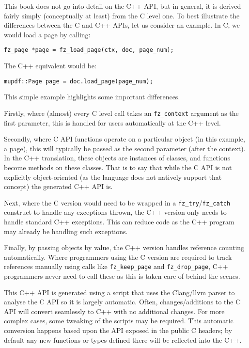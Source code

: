 \documentclass[oneside]{book}
\begin{document}
This book does not go into detail on the C++ API, but in general, it is derived fairly simply (conceptually at least) from the C level one. To best illustrate the differences between the C and C++ APIs, let us consider an example. In C, we would load a page by calling:

\begin{lstlisting}
fz_page *page = fz_load_page(ctx, doc, page_num);
\end{lstlisting}

The C++ equivalent would be:

\begin{lstlisting}
mupdf::Page page = doc.load_page(page_num);
\end{lstlisting}

This simple example highlights some important differences.

Firstly, where (almost) every C level call takes an \texttt{fz\_context} argument as the first parameter, this is handled for users automatically at the C++ level.

Secondly, where C API functions operate on a particular object (in this example, a page), this will typically be passed as the second parameter (after the context). In the C++ translation, these objects are instances of classes, and functions become methods on these classes. That is to say that while the C API is not explicitly object-oriented (as the language does not natively support that concept) the generated C++ API is.

Next, where the C version would need to be wrapped in a \texttt{fz\_try}/\texttt{fz\_catch} construct to handle any exceptions thrown, the C++ version only needs to handle standard C++ exceptions. This can reduce code as the C++ program may already be handling such exceptions.

Finally, by passing objects by value, the C++ version handles reference counting automatically. Where programmers using the C version are required to track references manually using calls like \texttt{fz\_keep\_page} and \texttt{fz\_drop\_page}, C++ programmers never need to call these as this is taken care of behind the scenes.

This C++ API is generated using a script that uses the Clang/llvm parser to analyse the C API so it is largely automatic. Often, changes/additions to the C API will convert seamlessly to C++ with no additional changes. For more complex cases, some tweaking of the scripts may be required. This automatic conversion happens based upon the API exposed in the public C headers; by default any new functions or types defined there will be reflected into the C++.
\end{document}
